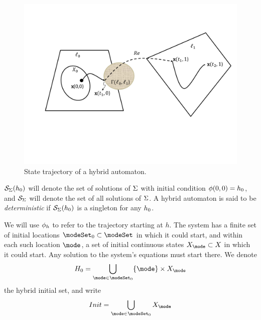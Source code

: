 \begin{figure}[tb]
	\centering
	\includegraphics[scale=0.4]{figures/HA.pdf}
	\caption{State trajectory of a hybrid automaton.}
	\label{fig:HA}
\end{figure}

\begin{defn}
	\label{def:solutionsets}
	$\mathcal{S}_\Sigma(h_0)$ will denote the set of solutions of $\Sigma$ with initial condition $\mathbf{\phi}(0,0) = h_0$,
	and $\mathcal{S}_\Sigma$ will denote the set of all solutions of $\Sigma$.
	A hybrid automaton is said to be \emph{deterministic} if $\mathcal{S}_\Sigma(h_0)$ is a singleton for any $h_0$.
\end{defn}

We will use $\mathbf{\phi}_h$ to refer to the trajectory starting at $h$.
The system has a finite set of initial locations $\modeSet_0 \subset \modeSet$ in which it could start, 
and within each such location $\mode$, a set of initial continuous states $\stSet_\mode \subset \stSet$ in which it could start. 
Any solution to the system's equations must start there. We denote 
\[H_0 = \bigcup_{\mode \in \modeSet_0} \{\mode\}\times \stSet_\mode\]
the hybrid initial set, and write
\[Init = \bigcup_{\mode \in \modeSet_0}\stSet_\mode \]
